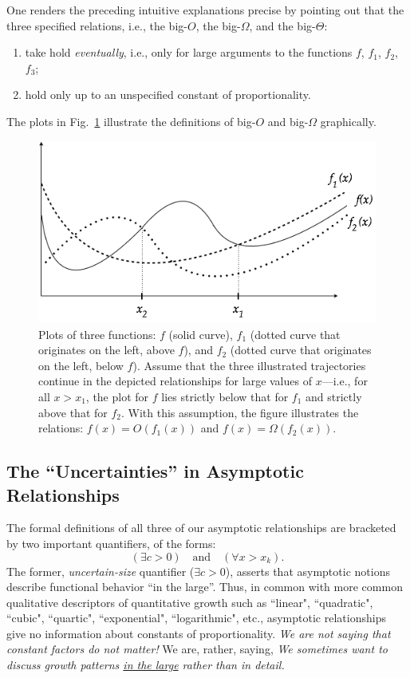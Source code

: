 One renders the preceding intuitive explanations precise by pointing out that the three specified relations, i.e., the big-$O$, the big-$\Omega$, and the big-$\Theta$:
\begin{enumerate}
\item
take hold {\em eventually}, i.e., only for large arguments to the functions $f$, $f_1$, $f_2$, $f_3$;
\medskip\item
hold only up to an unspecified constant of proportionality.
\end{enumerate}
The plots in Fig.~\ref{fig:Asymptotic} illustrate the definitions of big-$O$ and big-$\Omega$ graphically.
\begin{figure}[htb]
\begin{center}
       \includegraphics[scale=0.4]{FiguresArithmetic/NotationAsymptotic}
\caption{Plots of three functions: $f$ (solid curve), $f_1$ (dotted curve that originates on the left, above $f$), and $f_2$ (dotted curve that originates on the left, below $f$).  Assume that the three illustrated trajectories continue in the depicted relationships for large values of $x$---i.e., for all $x > x_1$, the plot for $f$ lies strictly below that for $f_1$ and strictly above that for $f_2$.  With this assumption, the figure illustrates the relations: $f(x) = O(f_1(x))$ and $f(x) = \Omega(f_2(x))$.}
\label{fig:Asymptotic}
\end{center}
\end{figure}

\subsection{The ``Uncertainties'' in Asymptotic Relationships}
\label{sec:uncertainties-asymptotics}

The formal definitions of all three of our asymptotic relationships are bracketed by two important quantifiers, of the forms:
\[ 
(\exists c >0) \ \ \ \mbox{ and }  \ \ \  (\forall x > x_k).
\]
The former, {\em uncertain-size} quantifier ($\exists c >0$), asserts that asymptotic notions describe functional behavior ``in the large''.  Thus, in common with more common qualitative descriptors of quantitative growth such as ``linear", ``quadratic", ``cubic", ``quartic", ``exponential", ``logarithmic", etc., asymptotic relationships give no information about constants of proportionality.  {\em We are not saying that constant factors do not matter!}  We are, rather, saying, {\em We sometimes want to discuss growth patterns \underline{in the large} rather than in detail.}

